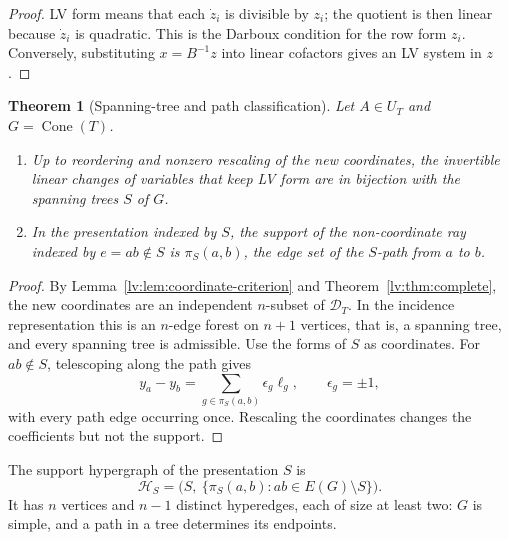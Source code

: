 \documentclass[11pt,a4paper]{article}
\newtheorem{theorem}{Theorem}[section]
\theoremstyle{definition}
\theoremstyle{remark}
\newcommand{\Cone}{\operatorname{Cone}}
\begin{document}
\begin{proof}
LV form means that each $\dot z_i$ is divisible by $z_i$; the quotient is then linear because $\dot z_i$ is quadratic. This is the Darboux condition for the row form $z_i$. Conversely, substituting $x=B^{-1}z$ into linear cofactors gives an LV system in $z$.
\end{proof}

\begin{theorem}[Spanning-tree and path classification]
\label{lv:thm:all-coordinates}
Let $A\in U_T$ and $G=\Cone(T)$.
\begin{enumerate}
\item Up to reordering and nonzero rescaling of the new coordinates, the invertible linear changes of variables that keep LV form are in bijection with the spanning trees $S$ of $G$.
\item In the presentation indexed by $S$, the support of the non-coordinate ray indexed by $e=ab\notin S$ is $\pi_S(a,b)$, the edge set of the $S$-path from $a$ to $b$.
\end{enumerate}
\end{theorem}

\begin{proof}
By Lemma~\ref{lv:lem:coordinate-criterion} and Theorem~\ref{lv:thm:complete}, the new coordinates are an independent $n$-subset of $\mathcal D_T$. In the incidence representation this is an $n$-edge forest on $n+1$ vertices, that is, a spanning tree, and every spanning tree is admissible. Use the forms of $S$ as coordinates. For $ab\notin S$, telescoping along the path gives
\begin{equation}
  y_a-y_b=\sum_{g\in \pi_S(a,b)}\epsilon_g\ell_g,
  \qquad \epsilon_g=\pm1,
  \label{lv:eq:path-expansion}
\end{equation}
with every path edge occurring once. Rescaling the coordinates changes the coefficients but not the support.
\end{proof}

The support hypergraph of the presentation $S$ is
\begin{equation}
 \mathcal H_S=
 \bigl(S,\ \{\pi_S(a,b):ab\in E(G)\setminus S\}\bigr).
 \label{lv:eq:fundamental-hypergraph}
\end{equation}
It has $n$ vertices and $n-1$ distinct hyperedges, each of size at least two: $G$ is simple, and a path in a tree determines its endpoints.
\end{document}
